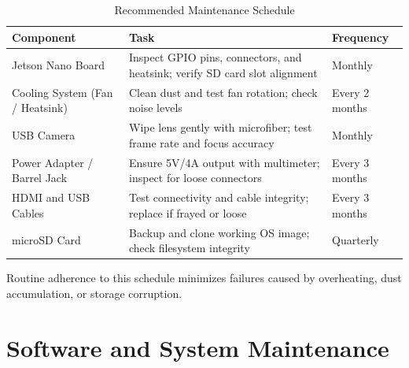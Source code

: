\begin{table}[H]
	\centering
	\caption{Recommended Maintenance Schedule}
	\begin{tabular}{|L{3.2cm}|L{7.8cm}|L{3.0cm}|}
		\hline
		\textbf{Component} & \textbf{Task} & \textbf{Frequency} \\ \hline
		Jetson Nano Board & Inspect GPIO pins, connectors, and heatsink; verify SD card slot alignment & Monthly \\ \hline
		Cooling System (Fan / Heatsink) & Clean dust and test fan rotation; check noise levels & Every 2 months \\ \hline
		USB Camera & Wipe lens gently with microfiber; test frame rate and focus accuracy & Monthly \\ \hline
		Power Adapter / Barrel Jack & Ensure 5V/4A output with multimeter; inspect for loose connectors & Every 3 months \\ \hline
		HDMI and USB Cables & Test connectivity and cable integrity; replace if frayed or loose & Every 3 months \\ \hline
		microSD Card & Backup and clone working OS image; check filesystem integrity & Quarterly \\ \hline
	\end{tabular}
\end{table}

\vspace{0.4cm}

Routine adherence to this schedule minimizes failures caused by overheating, dust accumulation, or storage corruption.

\section{Software and System Maintenance}

